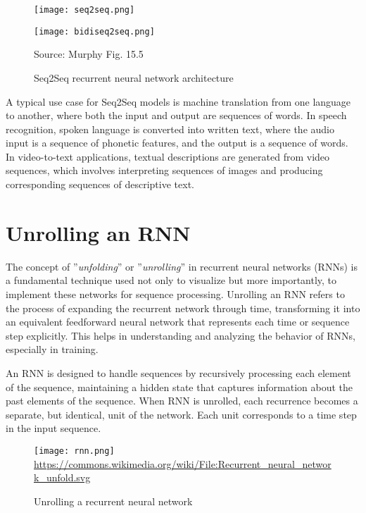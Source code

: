 \begin{figure}
\centering
\begin{minipage}{.45\textwidth}
\centering

\texttt{[image: seq2seq.png]} 
\end{minipage}
\begin{minipage}{.45\textwidth}
\centering

\texttt{[image: bidiseq2seq.png]}
\end{minipage}

\scriptsize Source: Murphy Fig. 15.5
\caption{Seq2Seq recurrent neural network architecture}
\label{fig:seq2seq}
\end{figure}

A typical use case for Seq2Seq models is machine translation from one language to another, where both the input and output are sequences of words. In speech recognition, spoken language is converted into written text, where the audio input is a sequence of phonetic features, and the output is a sequence of words. In video-to-text applications, textual descriptions are generated from video sequences, which involves interpreting sequences of images and producing corresponding sequences of descriptive text.

\section{Unrolling an RNN}

The concept of ''\emph{unfolding}'' or ''\emph{unrolling}'' in recurrent neural networks (RNNs) is a fundamental technique used not only to visualize but more importantly, to implement these networks for sequence processing. Unrolling an RNN refers to the process of expanding the recurrent network through time, transforming it into an equivalent feedforward neural network that represents each time or sequence step explicitly. This helps in understanding and analyzing the behavior of RNNs, especially in training.

An RNN is designed to handle sequences by recursively processing each element of the sequence, maintaining a hidden state that captures information about the past elements of the sequence. When RNN is unrolled, each recurrence becomes a separate, but identical, unit of the network. Each unit corresponds to a time step in the input sequence.

\begin{figure}
\centering
\texttt{[image: rnn.png]}
\scriptsize \url{https://commons.wikimedia.org/wiki/File:Recurrent_neural_network_unfold.svg}
\caption{Unrolling a recurrent neural network}
\label{fig:unrolling}
\end{figure}


